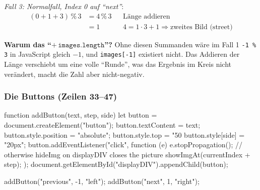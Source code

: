 \documentclass[a4paper,11pt]{article}
\begin{document}
\emph{Fall 3: Normalfall, Index 0 auf "`next"'}:
\begin{align*}
(0 + 1 + 3) \,\%\, 3 &= 4 \,\%\, 3 && \text{Länge addieren}\\
&= 1 && 4 = 1 \cdot 3 + 1 \Rightarrow \text{zweites Bild (street)}
\end{align*}

\textbf{Warum das "`$+\,\texttt{images.length}$"'?} Ohne diesen Summanden wäre im Fall 1
\lstinline|-1 % 3| in JavaScript gleich $-1$, und \lstinline|images[-1]| existiert nicht. Das Addieren der Länge
verschiebt um eine volle "`Runde"', was das Ergebnis im Kreis nicht verändert, macht die Zahl aber nicht-negativ.

\subsubsection*{Die Buttons (Zeilen 33--47)}
\begin{code}[firstnumber=33]
function addButton(text, step, side) {
   let button = document.createElement("button");
   button.textContent = text;
   button.style.position = "absolute";
   button.style.top = "50%
   button.style[side] = "20px";
   button.addEventListener("click", function (e) {
      e.stopPropagation(); // otherwise hideImg on displayDIV closes the picture
      showImgAt(currentIndex + step);
   });
   document.getElementById("displayDIV").appendChild(button);
}

addButton("previous", -1, "left");
addButton("next", 1, "right");
\end{code}
\end{document}
